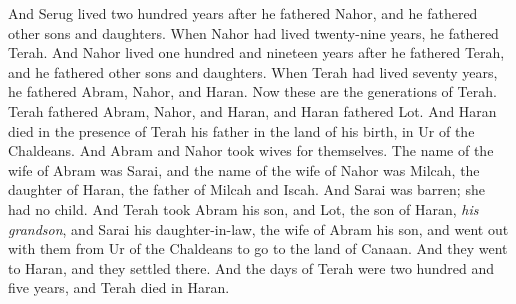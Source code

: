 \begin{biblechapter}
\verse And Serug lived two hundred years after he fathered Nahor, and he fathered other sons and daughters.
\verse When Nahor had lived twenty-nine years, he fathered Terah.
\verse And Nahor lived one hundred and nineteen years after he fathered Terah, and he fathered other sons and daughters.
\verse When Terah had lived seventy years, he fathered Abram, Nahor, and Haran.
 Now these are the generations of Terah. Terah fathered Abram, Nahor, and Haran, and Haran fathered Lot.
\verse And Haran died in the presence of Terah his father in the land of his birth, in Ur of the Chaldeans.
\verse And Abram and Nahor took wives for themselves. The name of the wife of Abram was Sarai, and the name of the wife of Nahor was Milcah, the daughter of Haran, the father of Milcah and Iscah.
\verse And Sarai was barren; she had no child.
\verse And Terah took Abram his son, and Lot, the son of Haran, \textit{his grandson}, and Sarai his daughter-in-law, the wife of Abram his son, and went out with them from Ur of the Chaldeans to go to the land of Canaan. And they went to Haran, and they settled there.
\verse And the days of Terah were two hundred and five years, and Terah died in Haran.
\end{biblechapter}

